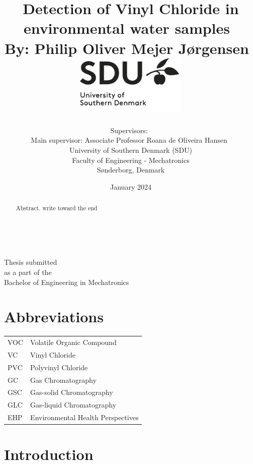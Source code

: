 \documentclass{article}
\title{\textbf{Detection of Vinyl Chloride in environmental water samples}~\\[5mm]
\large{By: Philip Oliver Mejer Jørgensen}~\\[5mm]
\includegraphics[width=0.4\textwidth]{sdulogo.png}}
\author{
Supervisors:~\\[3mm]
Main supervisor: Associate Professor Roana de Oliveira Hansen~\\[15mm]
University of Southern Denmark (SDU)\\
Faculty of Engineering - Mechatronics\\
Sønderborg, Denmark
}
\date{January 2024}
\begin{document}
\maketitle
~\\[2mm]
\begin{center}
\large{
Thesis submitted\\
as a part of the\\
Bachelor of Engineering in Mechatronics
}
\end{center}
\thispagestyle{empty}
\newpage

\begin{abstract}
Abstract. write toward the end
\end{abstract}

\listoffigures

\section*{Abbreviations}
\begin{tabular}{ll}
VOC     & Volatile Organic Compound \\
VC      & Vinyl Chloride \\
PVC     & Polyvinyl Chloride \\
GC      & Gas Chromatography \\
GSC     & Gas-solid Chromatography \\
GLC     & Gas-liquid Chromatography \\
EHP     & Environmental Health Perspectives \\
\end{tabular}
\newpage

\tableofcontents

\newpage




\section{Introduction}
\end{document}
